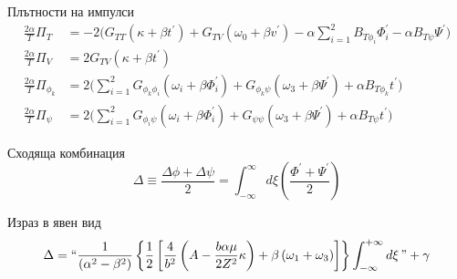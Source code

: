 \documentclass[bulg]{beamer}
\begin{document}
\begin{frame}
  \tiny
  \begin{alertblock}{\tiny Плътности на импулси}
\vspace{-0.5cm}
\begin{align*}
  \frac{2 \alpha}{T} \Pi_{T} &=-2\Big(G_{T T}\left(\kappa+\beta
  t^{\prime}\right)+G_{T V}\left(\omega_{0}+\beta v^{\prime}\right)-\alpha
\sum_{i=1}^{2} B_{T \phi_{i}} \Phi_{i}^{\prime}-\alpha B_{T \psi}
\Psi^{\prime}\Big)\\
  \frac{2 \alpha}{T} \Pi_{V} &=2 G_{T V}\left(\kappa+\beta
      t^{\prime}\right)\\
  \frac{2 \alpha}{T} \Pi_{\phi_{k}} &=2\Big(\sum_{i=1}^{2} G_{\phi_{k}
        \phi_{i}}\left(\omega_{i}+\beta \Phi_{i}^{\prime}\right)+G_{\phi_{k}
    \psi}\left(\omega_{3}+\beta \Psi^{\prime}\right)+\alpha B_{T \phi_{k}}
  t^{\prime}\Big)\\
  \frac{2 \alpha}{T} \Pi_{\psi} &=2\Big(\sum_{i=1}^{2} G_{\phi_{i}
    \psi}\left(\omega_{i}+\beta \Phi_{i}^{\prime}\right)+G_{\psi
  \psi}\left(\omega_{3}+\beta \Psi^{\prime}\right)+\alpha B_{T \psi}
  t^{\prime}\Big)
      \end{align*}
    \end{alertblock}
  \small
\begin{exampleblock}{Сходяща комбинация}
 \begin{equation*}
    \Delta \equiv \frac{\Delta \phi + \Delta \psi}{2} = \int_{-\infty}^\infty d\xi
    \left (\frac{\Phi^\prime + \Psi^\prime}{2}\right)
  \end{equation*}
\end{exampleblock}
\begin{exampleblock}{Израз в явен вид}
\begin{equation*}
  \Delta=``\frac{1}{\left(\alpha^{2}-\beta^{2}\right)}\left\{\frac{1}{2}\left[\frac{4}{b^{2}}\left(A-\frac{b
  \alpha \mu}{2 Z^{2}}
  \kappa\right)+\beta\left(\omega_{1}+\omega_{3}\right)\right]\right\}
  \int_{-\infty}^{+\infty} d \xi\,\text{''} +\gamma
\end{equation*}
\end{exampleblock}
\end{frame}
\end{document}
